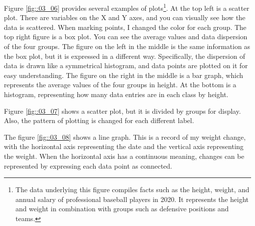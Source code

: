 \documentclass{ltjsbook}
\begin{document}
Figure \ref{fig::03_06} provides several examples of plots\footnote{The data underlying this figure compiles facts such as the height, weight, and annual salary of professional baseball players in 2020. It represents the height and weight in combination with groups such as defensive positions and teams.}. At the top left is a scatter plot. There are variables on the X and Y axes, and you can visually see how the data is scattered. When marking points, I changed the color for each group. The top right figure is a box plot. You can see the average values and data dispersion of the four groups. The figure on the left in the middle is the same information as the box plot, but it is expressed in a different way. Specifically, the dispersion of data is drawn like a symmetrical histogram, and data points are plotted on it for easy understanding. The figure on the right in the middle is a bar graph, which represents the average values of the four groups in height. At the bottom is a histogram, representing how many data entries are in each class by height.

Figure \ref{fig::03_07} shows a scatter plot, but it is divided by groups for display. Also, the pattern of plotting is changed for each different label.

The figure \ref{fig::03_08} shows a line graph. This is a record of my weight change, with the horizontal axis representing the date and the vertical axis representing the weight. When the horizontal axis has a continuous meaning, changes can be represented by expressing each data point as connected.
\end{document}

